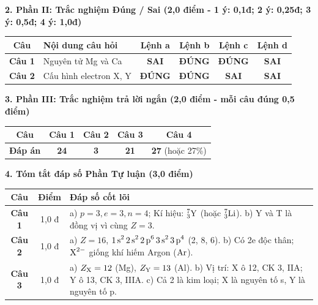 \documentclass[11pt,a4paper]{article}
\begin{document}
\vspace{2pt}
\noindent
\textbf{\color{mainGreen}2. Phần II: Trắc nghiệm Đúng / Sai (2,0 điểm - 1 ý: 0,1đ; 2 ý: 0,25đ; 3 ý: 0,5đ; 4 ý: 1,0đ)}
\begin{center}
\renewcommand{\arraystretch}{1.2}
\begin{tabular}{|c|p{4.2cm}|c|c|c|c|}
\hline
\rowcolor{tableGreen}
\textbf{Câu} & \textbf{Nội dung câu hỏi} & \textbf{Lệnh a} & \textbf{Lệnh b} & \textbf{Lệnh c} & \textbf{Lệnh d} \\
\hline
\textbf{Câu 1} & Nguyên tử Mg và Ca & \textbf{SAI} & \textbf{\color{hfRed}ĐÚNG} & \textbf{\color{hfRed}ĐÚNG} & \textbf{SAI} \\
\hline
\textbf{Câu 2} & Cấu hình electron X, Y & \textbf{\color{hfRed}ĐÚNG} & \textbf{\color{hfRed}ĐÚNG} & \textbf{SAI} & \textbf{SAI} \\
\hline
\end{tabular}
\end{center}

\vspace{2pt}
\noindent
\textbf{\color{mainGreen}3. Phần III: Trắc nghiệm trả lời ngắn (2,0 điểm - mỗi câu đúng 0,5 điểm)}
\begin{center}
\renewcommand{\arraystretch}{1.2}
\begin{tabular}{|c|c|c|c|c|}
\hline
\rowcolor{tableGreen}
\textbf{Câu} & \textbf{Câu 1} & \textbf{Câu 2} & \textbf{Câu 3} & \textbf{Câu 4} \\
\hline
\textbf{Đáp án} & \textbf{\color{hfRed}24} & \textbf{\color{hfRed}3} & \textbf{\color{hfRed}21} & \textbf{\color{hfRed}27} (hoặc 27\%) \\
\hline
\end{tabular}
\end{center}

\vspace{2pt}
\noindent
\textbf{\color{mainGreen}4. Tóm tắt đáp số Phần Tự luận (3,0 điểm)}
\begin{center}
\renewcommand{\arraystretch}{1.2}
\begin{tabular}{|c|c|p{11.5cm}|}
\hline
\rowcolor{tableGreen}
\textbf{Câu} & \textbf{Điểm} & \textbf{Đáp số cốt lõi} \\
\hline
\textbf{Câu 1} & 1,0 đ & a) $p = 3, e = 3, n = 4$; Kí hiệu: $^{7}_{3}\ce{Y}$ (hoặc $^{7}_{3}\ce{Li}$). \quad b) Y và T là đồng vị vì cùng $Z = 3$. \\
\hline
\textbf{Câu 2} & 1,0 đ & a) $Z = 16$, $\ce{1s^2 2s^2 2p^6 3s^2 3p^4}$ (2, 8, 6). \quad b) Có 2e độc thân; $\ce{X^2-}$ giống khí hiếm Argon ($\ce{Ar}$). \\
\hline
\textbf{Câu 3} & 1,0 đ & a) $Z_{\ce{X}} = 12$ (Mg), $Z_{\ce{Y}} = 13$ (Al). \quad b) Vị trí: X ô 12, CK 3, IIA; Y ô 13, CK 3, IIIA. \quad c) Cả 2 là kim loại; X là nguyên tố s, Y là nguyên tố p. \\
\hline
\end{tabular}
\end{center}
\end{document}
